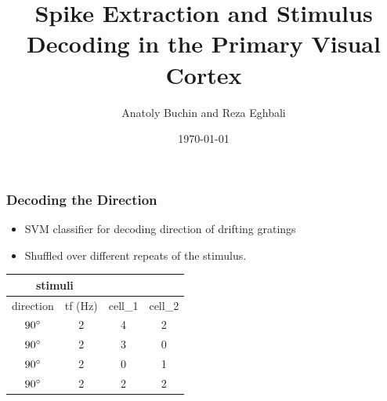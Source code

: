 \documentclass[10pt,mathserif]{beamer}
\title{\large \bfseries Spike Extraction and Stimulus Decoding in the Primary Visual Cortex}
\author{Anatoly Buchin and Reza Eghbali}
\date{\today}
\begin{document}
\frame{
\thispagestyle{empty}
\titlepage
}

{

}
\begin{frame}
\frametitle{\bf Decoding the Direction}
\begin{itemize}
\item SVM classifier for decoding direction of drifting gratings
\item Shuffled over different repeats of the stimulus. 
\end{itemize}
{\begin{center}
\begin{tabular}{|c|c|cc}
\cline{1-2}
\multicolumn{2}{|c|}{stimuli}  & &\\
\hline
direction & tf (Hz) & \multicolumn{1}{c|}{cell\_1} & \multicolumn{1}{c|}{cell\_2}\\
\hline
$90\degree$ &  2 & \multicolumn{1}{c|}{\cellcolor{red} 4} & \multicolumn{1}{c|}{\cellcolor{red} 2}\\
\hline
$90\degree$ &  2 & \multicolumn{1}{c|}{\cellcolor{green} 3} & \multicolumn{1}{c|}{\cellcolor{green} 0}\\
\hline
$90\degree$ &  2 & \multicolumn{1}{c|}{\cellcolor{blue} 0} & \multicolumn{1}{c|}{\cellcolor{blue} 1}\\
\hline
$90\degree$ &  2 & \multicolumn{1}{c|}{\cellcolor{yellow} 2} & \multicolumn{1}{c|}{\cellcolor{yellow} 2}\\
\hline
\end{tabular}
\end{center}}
\end{frame}
\end{document}
